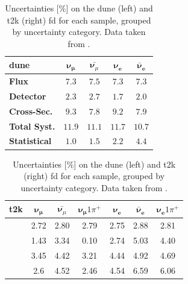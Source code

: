 \begin{table}[H]
    \centering
    \caption[]{Uncertainties [$\%$] on the \acrshort{dune} (left) and \acrshort{t2k} (right) \acrlong{fd} for each sample, grouped by uncertainty category. Data taken from \cite{dune-OA,t2k-OA}.}
    \label{tab:uncertainties}
    \begin{minipage}{0.44\textwidth}
        \centering
        \begin{tabular}{|l||c|c|c|c|}
            \hline
            \textbf{\acrshort{dune}} & $\boldsymbol{\nu_\mu}$ & $\bar{\boldsymbol{\nu}_\mu}$ & $\boldsymbol{\nu_e}$ & $\boldsymbol{\bar{\nu}_e}$ \\ \hline \hline
            \textbf{Flux} & $7.3$ & $7.5$ & $7.3$ & $7.3$ \\ \hline
            \textbf{Detector} & $2.3$ & $2.7$ & $1.7$ & $2.0$ \\ \hline
            \textbf{Cross-Sec.} & $9.3$ & $7.8$ & $9.2$ & $7.9$ \\ \hline \hline
            \textbf{Total Syst.} & $11.9$ & $11.1$ & $11.7$ & $10.7$ \\ \hline \hline
            \textbf{Statistical} & $1.0$ & $1.5$ & $2.2$ & $4.4$ \\
            \hline \hline
        \end{tabular}
    \end{minipage}
    \hfill
    \begin{minipage}[t]{0.55\textwidth}
        \vspace{-18.5mm}
        \begin{tabular}{|l||c|c|c|c|c|c|}
            \hline
            \textbf{\acrshort{t2k}} & $\boldsymbol{\nu_\mu}$ & $\bar{\boldsymbol{\nu}_\mu}$ & $\boldsymbol{\nu_\mu}1\pi^+$ & $\boldsymbol{\nu_e}$ & $\boldsymbol{\bar{\nu}_e}$ & $\boldsymbol{\nu_e}1\pi^+$ \\ \hline \hline
             & 2.72 & 2.80 & 2.79 & 2.75 & 2.88 & 2.81 \\ \hline
             & 1.43 & 3.34 & 0.10 & 2.74 & 5.03 & 4.40 \\ \hline
             & 3.45 & 4.42 & 3.21 & 4.44 & 4.92 & 4.69 \\ \hline \hline
             & 2.6 & 4.52 & 2.46 & 4.54 & 6.59 & 6.06 \\ \hline \hline
        \end{tabular}
    \end{minipage}
\end{table}
%

